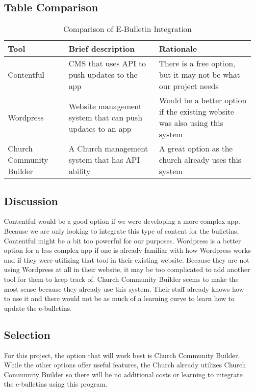 \documentclass[letterpaper,10pt,draftclsnofoot,onecolumn,titlepage]{IEEEtran}
\begin{document}
	\subsection{Table Comparison}
	\begin{table}[ht]
	\caption{Comparison of E-Bulletin Integration}
	\begin{center}
	\begin{tabular} { | m{3cm} | m{5cm} | m{5cm} | }
	\hline\hline
	Tool & Brief description & Rationale \\ [0.5ex]
	\hline
	Contentful & CMS that uses API to push updates to the app & There is a free option, but it may not be what our project needs \\
	\hline
	Wordpress & Website management system that can push updates to an app & Would be a better option if the existing website was also using this system \\
	\hline
	Church Community Builder & A Church management system that has API ability & A great option as the church already uses this system \\
	\hline
	\end{tabular}
	\end{center}
	\end{table}
	\subsection{Discussion}
	Contentful would be a good option if we were developing a more complex app.
	Because we are only looking to integrate this type of content for the bulletins, Contentful might be a bit too powerful for our purposes.
	Wordpress is a better option for a less complex app if one is already familiar with how Wordpress works and if they were utilizing that tool in their existing website.
	Because they are not using Wordpress at all in their website, it may be too complicated to add another tool for them to keep track of.
	Church Community Builder seems to make the most sense because they already use this system.
	Their staff already knows how to use it and there would not be as much of a learning curve to learn how to update the e-bulletins.

	\subsection{Selection}
	For this project, the option that will work best is Church Community Builder.
	While the other options offer useful features, the Church already utilizes Church Community Builder so there will be no additional costs or learning to integrate the e-bulletins using this program.
\end{document}
